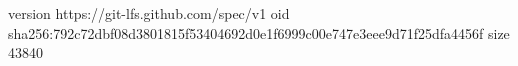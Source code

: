 version https://git-lfs.github.com/spec/v1
oid sha256:792c72dbf08d3801815f53404692d0e1f6999c00e747e3eee9d71f25dfa4456f
size 43840
